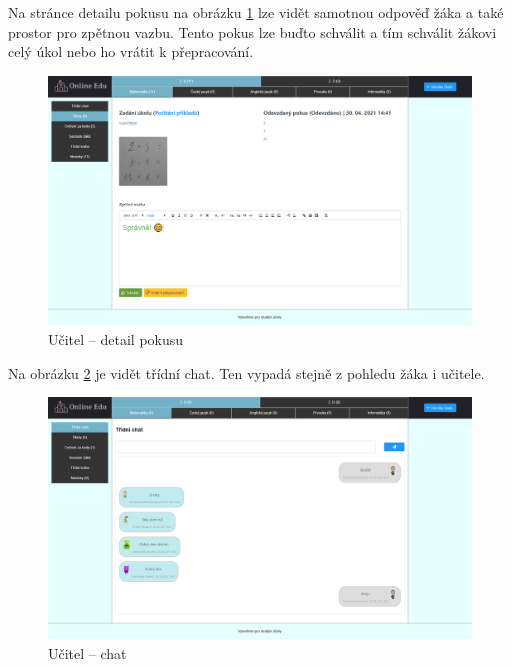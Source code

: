 \documentclass[twoside]{ctuthesis}
\theoremstyle{plain}
\theoremstyle{definition}
\theoremstyle{note}
\begin{document}
Na stránce detailu pokusu na obrázku \ref{ref:ucitel-detail-pokusu} lze vidět samotnou odpověď žáka a také prostor pro zpětnou vazbu. Tento pokus lze buďto schválit a tím schválit žákovi celý úkol nebo ho vrátit k přepracování.
\begin{figure}[H]
    \caption{Učitel -- detail pokusu}
    \label{ref:ucitel-detail-pokusu}
    \centering
    \includegraphics[width=\textwidth]{images/app_screenshots/ucitel_schvaleni_pokusu.png}
\end{figure}

Na obrázku \ref{ref:ucitel-chat} je vidět třídní chat. Ten vypadá stejně z pohledu žáka i učitele.
\begin{figure}[H]
    \caption{Učitel -- chat}
    \label{ref:ucitel-chat}
    \centering
    \includegraphics[width=\textwidth]{images/app_screenshots/ucitel_chat_avatari}
\end{figure}
\end{document}

